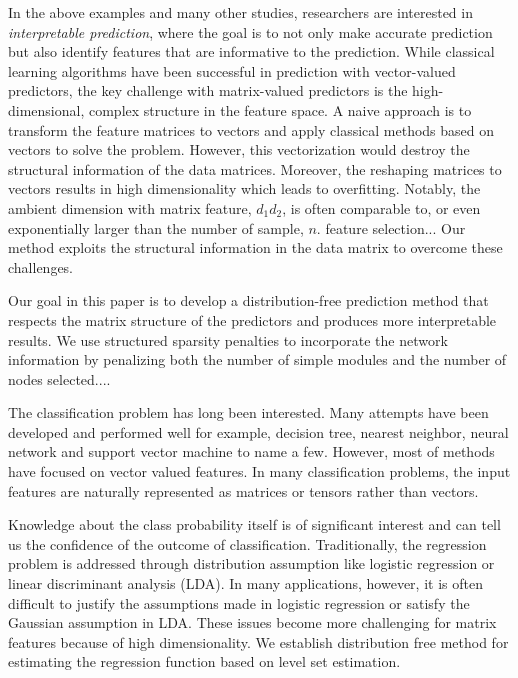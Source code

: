 \documentclass[12pt]{article}
\begin{document}
In the above examples and many other studies, researchers are interested in {\it interpretable prediction}, where the goal is to not only make accurate prediction but also identify features that are informative to the prediction. While classical learning algorithms have been successful in prediction with vector-valued predictors, the key challenge with matrix-valued predictors is the high-dimensional, complex structure in the feature space. A naive approach is to transform the feature matrices to vectors and apply classical methods based on vectors to solve the problem. However, this vectorization would destroy the structural information of the data matrices. Moreover, the reshaping matrices to vectors results in high dimensionality which leads to overfitting. 
Notably, the ambient dimension with matrix feature, $d_1d_2$, is often comparable to, or even exponentially larger than the number of sample, $n$. 
{\color{red} feature selection...}
Our method exploits the structural information in the data matrix to overcome these challenges. 

Our goal in this paper is to develop a distribution-free prediction method that respects the matrix structure of the predictors and produces more interpretable results. We use structured sparsity penalties to incorporate the network information by penalizing both the number of simple modules and the number of nodes selected.... 

The classification problem has long been interested. Many attempts have been developed and performed well for example, decision tree, nearest neighbor, neural network and support vector machine to name a few. However, most of methods have focused on vector valued features. In many classification problems, the input features are naturally represented as matrices or tensors rather than vectors. 


Knowledge about the class probability itself is of significant interest and can tell us the confidence of the outcome of classification. Traditionally, the regression problem is addressed through distribution assumption like logistic regression or linear discriminant analysis (LDA). In many applications, however, it is often difficult to  justify the assumptions made in logistic regression or satisfy the Gaussian assumption in LDA. These issues become more challenging for matrix features because of high dimensionality.
We establish distribution free method for estimating the regression function based on level set estimation. 
\end{document}
